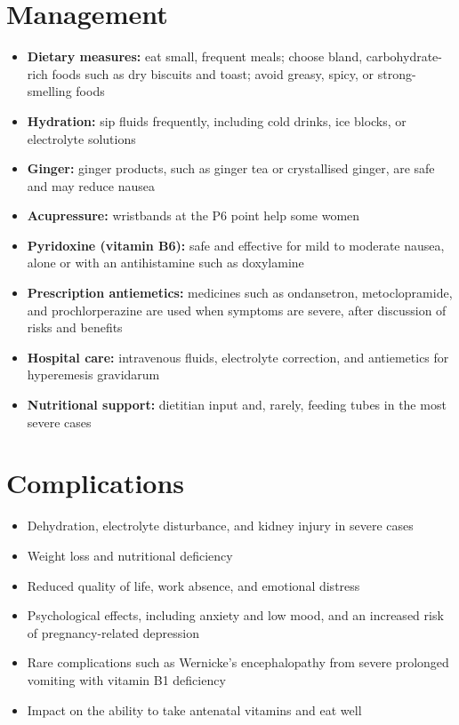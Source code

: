 \section*{Management}
\begin{itemize}
    \item \textbf{Dietary measures:} eat small, frequent meals; choose bland, carbohydrate-rich foods such as dry biscuits and toast; avoid greasy, spicy, or strong-smelling foods
    \item \textbf{Hydration:} sip fluids frequently, including cold drinks, ice blocks, or electrolyte solutions
    \item \textbf{Ginger:} ginger products, such as ginger tea or crystallised ginger, are safe and may reduce nausea
    \item \textbf{Acupressure:} wristbands at the P6 point help some women
    \item \textbf{Pyridoxine (vitamin B6):} safe and effective for mild to moderate nausea, alone or with an antihistamine such as doxylamine
    \item \textbf{Prescription antiemetics:} medicines such as ondansetron, metoclopramide, and prochlorperazine are used when symptoms are severe, after discussion of risks and benefits
    \item \textbf{Hospital care:} intravenous fluids, electrolyte correction, and antiemetics for hyperemesis gravidarum
    \item \textbf{Nutritional support:} dietitian input and, rarely, feeding tubes in the most severe cases
\end{itemize}

\section*{Complications}
\begin{itemize}
    \item Dehydration, electrolyte disturbance, and kidney injury in severe cases
    \item Weight loss and nutritional deficiency
    \item Reduced quality of life, work absence, and emotional distress
    \item Psychological effects, including anxiety and low mood, and an increased risk of pregnancy-related depression
    \item Rare complications such as Wernicke's encephalopathy from severe prolonged vomiting with vitamin B1 deficiency
    \item Impact on the ability to take antenatal vitamins and eat well
\end{itemize}

